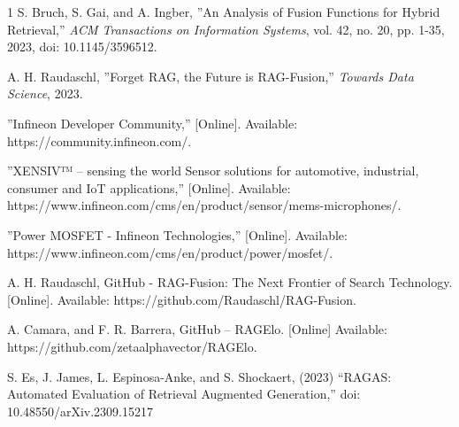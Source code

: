 \documentclass{article}
\begin{document}
\begin{thebibliography}{1}
S. Bruch, S. Gai, and A. Ingber, ''An Analysis of Fusion Functions for Hybrid Retrieval,'' {\it ACM Transactions on Information Systems}, vol. 42, no. 20, pp. 1-35, 2023, doi: 10.1145/3596512.

A. H. Raudaschl, ''Forget RAG, the Future is RAG-Fusion,'' {\it Towards Data Science}, 2023.

''Infineon Developer Community,'' [Online]. Available: https://community.infineon.com/.

''XENSIV™ – sensing the world
Sensor solutions for automotive, industrial,
consumer and IoT applications,'' [Online]. Available: https://www.infineon.com/cms/en/product/sensor/mems-microphones/.

''Power MOSFET - Infineon Technologies,'' [Online]. Available: https://www.infineon.com/cms/en/product/power/mosfet/.

A. H. Raudaschl, GitHub - RAG-Fusion: The Next Frontier of Search Technology. [Online]. Available: https://github.com/Raudaschl/RAG-Fusion.

A. Camara, and F. R. Barrera, GitHub – RAGElo. [Online] Available: https://github.com/zetaalphavector/RAGElo.

S. Es, J. James, L. Espinosa-Anke, and S. Shockaert, (2023) “RAGAS: Automated Evaluation of Retrieval Augmented Generation,” doi: 10.48550/arXiv.2309.15217

\end{thebibliography}\vspace*{-8pt}
\end{document}
